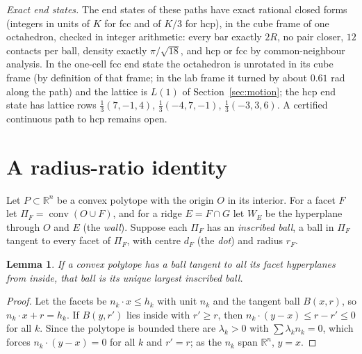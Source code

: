 \documentclass[11pt]{amsart}
\newtheorem{lemma}{Lemma}
\theoremstyle{definition}
\theoremstyle{remark}
\newcommand{\R}{\mathbb{R}}
\begin{document}
\emph{Exact end states.} The end states of these paths have exact rational closed forms (integers in units of $K$ for fcc and of $K/3$ for hcp), in the cube frame of one octahedron, checked in integer arithmetic: every bar exactly $2R$, no pair closer, $12$ contacts per ball, density exactly $\pi/\sqrt{18}$, and hcp or fcc by common-neighbour analysis. In the one-cell fcc end state the octahedron is unrotated in its cube frame (by definition of that frame; in the lab frame it turned by about $0.61$ rad along the path) and the lattice is $L(1)$ of Section~\ref{sec:motion}; the hcp end state has lattice rows $\frac13(7,-1,4)$, $\frac13(-4,7,-1)$, $\frac13(-3,3,6)$. A certified continuous path to hcp remains open.

\section{A radius-ratio identity}\label{sec:ratio}

Let $P\subset\R^n$ be a convex polytope with the origin $O$ in its interior. For a facet $F$ let $\Pi_F=\operatorname{conv}(O\cup F)$, and for a ridge $E=F\cap G$ let $W_E$ be the hyperplane through $O$ and $E$ (the \emph{wall}). Suppose each $\Pi_F$ has an \emph{inscribed ball}, a ball in $\Pi_F$ tangent to every facet of $\Pi_F$, with centre $d_F$ (the \emph{dot}) and radius $r_F$.

\begin{lemma}\label{lem:unique}
If a convex polytope has a ball tangent to all its facet hyperplanes from inside, that ball is its unique largest inscribed ball.
\end{lemma}

\begin{proof}
Let the facets be $n_k\cdot x\le h_k$ with unit $n_k$ and the tangent ball $B(x,r)$, so $n_k\cdot x+r=h_k$. If $B(y,r')$ lies inside with $r'\ge r$, then $n_k\cdot(y-x)\le r-r'\le0$ for all $k$. Since the polytope is bounded there are $\lambda_k>0$ with $\sum\lambda_kn_k=0$, which forces $n_k\cdot(y-x)=0$ for all $k$ and $r'=r$; as the $n_k$ span $\R^n$, $y=x$.
\end{proof}
\end{document}
